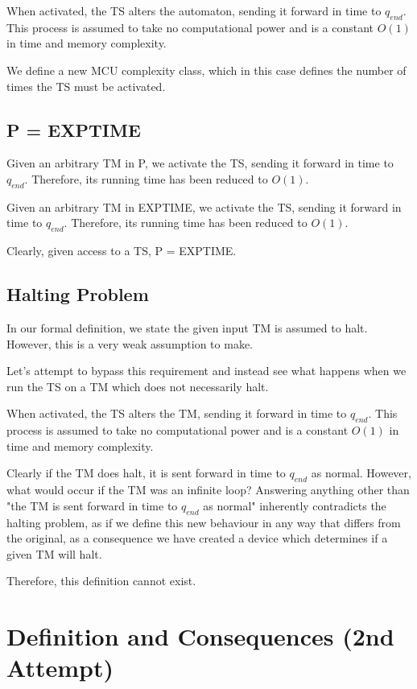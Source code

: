 \documentclass{report}
\begin{document}
When activated, the TS alters the automaton, sending it forward in time to $q_{end}$. This process is assumed to take no computational power and is a constant $O(1)$ in time and memory complexity.

We define a new MCU complexity class, which in this case defines the number of times the TS must be activated.

\subsection{P = EXPTIME}

Given an arbitrary TM in P, we activate the TS, sending it forward in time to $q_{end}$. Therefore, its running time has been reduced to $O(1)$.

Given an arbitrary TM in EXPTIME, we activate the TS, sending it forward in time to $q_{end}$. Therefore, its running time has been reduced to $O(1)$.

Clearly, given access to a TS, P = EXPTIME.

\subsection{Halting Problem}

In our formal definition, we state the given input TM is assumed to halt. However, this is a very weak assumption to make.

Let's attempt to bypass this requirement and instead see what happens when we run the TS on a TM which does not necessarily halt.

When activated, the TS alters the TM, sending it forward in time to $q_{end}$. This process is assumed to take no computational power and is a constant $O(1)$ in time and memory complexity.

Clearly if the TM does halt, it is sent forward in time to $q_{end}$ as normal. However, what would occur if the TM was an infinite loop? Answering anything other than "the TM is sent forward in time to $q_{end}$ as normal" inherently contradicts the halting problem, as if we define this new behaviour in any way that differs from the original, as a consequence we have created a device which determines if a given TM will halt.

Therefore, this definition cannot exist.

\newpage
\section {Definition and Consequences (2nd Attempt)}
\end{document}
